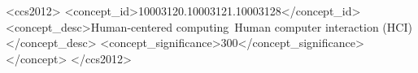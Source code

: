 \documentclass[sigconf]{acmart}
\begin{document}
\title{}



\author{Lukas Gehrke}

\author{Leonie Terfurth}
\orcid{}

\author{Klaus Gramann}

\renewcommand{\shortauthors}{Gehrke et al.}

\begin{abstract}

\end{abstract}


\begin{CCSXML}
<ccs2012>
    <concept_id>10003120.10003121.10003128</concept_id>
        <concept_desc>Human-centered computing~Human computer interaction (HCI)</concept_desc>
        <concept_significance>300</concept_significance>
    </concept>
 </ccs2012>
\end{CCSXML}


\end{document}
